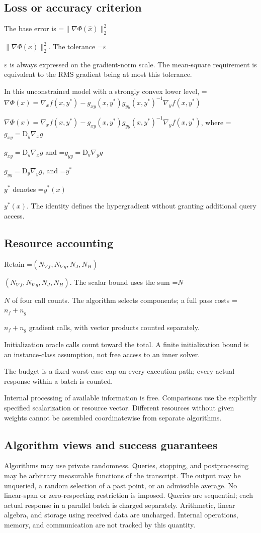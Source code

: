 \documentclass[10pt,a4paper]{article}
\newcommand{\AtlasMath}[1]{\par\begingroup\centering\setbox0=\hbox{$\displaystyle #1$}\ifdim\wd0>1.4\linewidth\typeout{ATLAS WIDE FORMULA: \the\wd0}\fi\ifdim\wd0>\linewidth\resizebox{\linewidth}{!}{\box0}\else\box0\fi\par\endgroup}
\newcommand{\AtlasInlineMath}[1]{\begingroup\setbox0=\hbox{$#1$}\ifdim\wd0>.4\linewidth\endgroup\AtlasMath{#1}\else\endgroup$#1$\fi}
\begin{document}
\subsection{Loss or accuracy criterion}
The base error is \AtlasInlineMath{\|\nabla\Phi(\widehat{x})\|_2^2}. The tolerance \AtlasInlineMath{\varepsilon} is always expressed on the gradient-norm scale. The mean-square requirement is equivalent to the RMS gradient being at most this tolerance.

In this unconstrained model with a strongly convex lower level, \AtlasInlineMath{\nabla\Phi(x)=\nabla_x f(x,y^*)-g_{xy}(x,y^*)g_{yy}(x,y^*)^{-1}\nabla_y f(x,y^*)}, where \AtlasInlineMath{g_{xy}=\mathrm{D}_y\nabla_x g} and \AtlasInlineMath{g_{yy}=\mathrm{D}_y\nabla_y g}, and \AtlasInlineMath{y^*} denotes \AtlasInlineMath{y^*(x)}. The identity defines the hypergradient without granting additional query access.

\subsection{Resource accounting}
Retain \AtlasInlineMath{(N_{\nabla f},N_{\nabla g},N_J,N_H)}. The scalar bound uses the sum \AtlasInlineMath{N} of four call counts. The algorithm selects components; a full pass costs \AtlasInlineMath{n_f+n_g} gradient calls, with vector products counted separately.

Initialization oracle calls count toward the total. A finite initialization bound is an instance-class assumption, not free access to an inner solver.

The budget is a fixed worst-case cap on every execution path; every actual response within a batch is counted.

Internal processing of available information is free. Comparisons use the explicitly specified scalarization or resource vector. Different resources without given weights cannot be assembled coordinatewise from separate algorithms.

\subsection{Algorithm views and success guarantees}
Algorithms may use private randomness. Queries, stopping, and postprocessing may be arbitrary measurable functions of the transcript. The output may be unqueried, a random selection of a past point, or an admissible average. No linear-span or zero-respecting restriction is imposed. Queries are sequential; each actual response in a parallel batch is charged separately. Arithmetic, linear algebra, and storage using received data are uncharged. Internal operations, memory, and communication are not tracked by this quantity.
\end{document}
